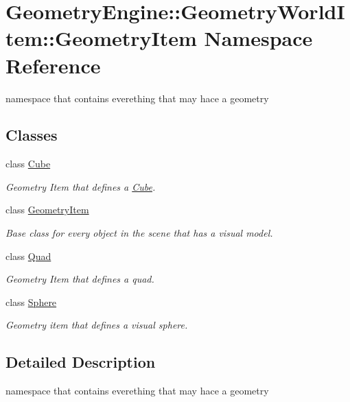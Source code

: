 \hypertarget{namespace_geometry_engine_1_1_geometry_world_item_1_1_geometry_item}{}\section{Geometry\+Engine\+::Geometry\+World\+Item\+::Geometry\+Item Namespace Reference}
\label{namespace_geometry_engine_1_1_geometry_world_item_1_1_geometry_item}


namespace that contains everething that may hace a geometry  


\subsection*{Classes}
\begin{DoxyCompactItemize}
\item 
class \mbox{\hyperlink{class_geometry_engine_1_1_geometry_world_item_1_1_geometry_item_1_1_cube}{Cube}}
\begin{DoxyCompactList}\small\item\em Geometry Item that defines a \mbox{\hyperlink{class_geometry_engine_1_1_geometry_world_item_1_1_geometry_item_1_1_cube}{Cube}}. \end{DoxyCompactList}\item 
class \mbox{\hyperlink{class_geometry_engine_1_1_geometry_world_item_1_1_geometry_item_1_1_geometry_item}{Geometry\+Item}}
\begin{DoxyCompactList}\small\item\em Base class for every object in the scene that has a visual model. \end{DoxyCompactList}\item 
class \mbox{\hyperlink{class_geometry_engine_1_1_geometry_world_item_1_1_geometry_item_1_1_quad}{Quad}}
\begin{DoxyCompactList}\small\item\em Geometry Item that defines a quad. \end{DoxyCompactList}\item 
class \mbox{\hyperlink{class_geometry_engine_1_1_geometry_world_item_1_1_geometry_item_1_1_sphere}{Sphere}}
\begin{DoxyCompactList}\small\item\em Geometry item that defines a visual sphere. \end{DoxyCompactList}\end{DoxyCompactItemize}


\subsection{Detailed Description}
namespace that contains everething that may hace a geometry 